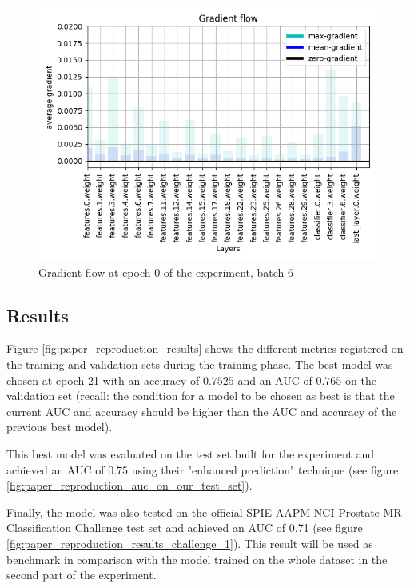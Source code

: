 \begin{figure}[!h]
\centering
\includegraphics[width=1\textwidth, keepaspectratio=true]{./figures/gradient_flow.png}
\caption{Gradient flow at epoch 0 of the experiment, batch 6}
\label{fig:gradient_flow}
\end{figure}


\subsection{Results}
\label{sec:paper_reproduction_results}
\setlength{\marginparwidth}{3cm}\leavevmode {}Figure \ref{fig:paper_reproduction_results} shows the different metrics registered on the training and validation sets during the training phase. The best model was chosen at epoch 21 with an accuracy of $0.7525$ and an AUC of $0.765$ on the validation set (recall: the condition for a model to be chosen as best is that the current AUC and accuracy should be higher than the AUC and accuracy of the previous best model).

This best model was evaluated on the test set built for the experiment and achieved an AUC of $0.75$ using their "enhanced prediction" technique (see figure \ref{fig:paper_reproduction_auc_on_our_test_set}).

Finally, the model was also tested on the official SPIE-AAPM-NCI Prostate MR Classification Challenge test set and achieved an AUC of 0.71 (see figure \ref{fig:paper_reproduction_results_challenge_1}). This result will be used as benchmark in comparison with the model trained on the whole dataset in the second part of the experiment.

